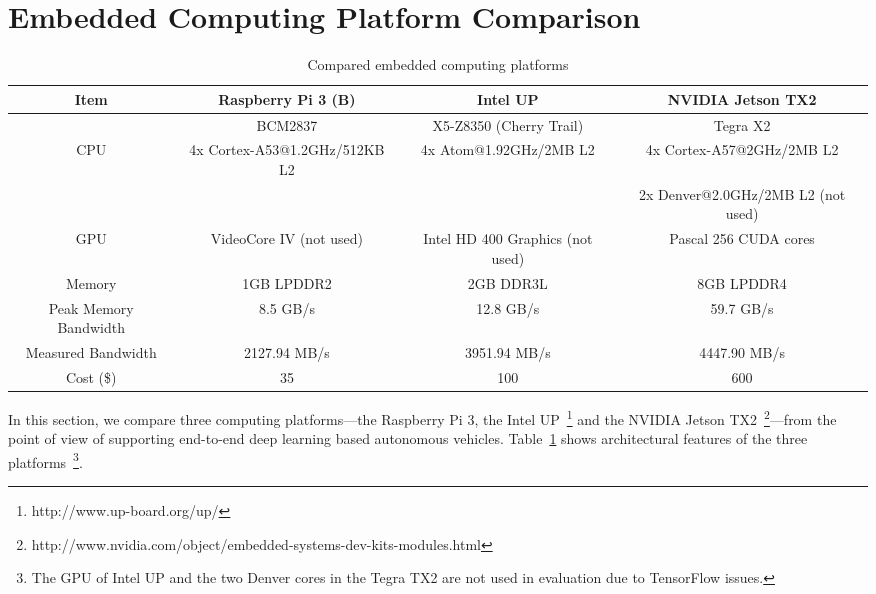 
%

\section{Embedded Computing Platform Comparison}\label{sec:comparison}


\begin{table}[h]
  \centering
  \begin{adjustbox}{width=1\textwidth}
  \begin{tabular}{|c|c|c|c|}
    \hline
    Item    & Raspberry Pi 3 (B)   & Intel UP                  & NVIDIA Jetson TX2\\
    \hline
            & BCM2837              & X5-Z8350 (Cherry Trail)   & Tegra X2 \\
    CPU     & 4x Cortex-A53@1.2GHz/512KB L2  &
              4x Atom@1.92GHz/2MB L2 &
              4x Cortex-A57@2GHz/2MB L2 \\
            &              &              & 2x Denver@2.0GHz/2MB L2 (not used)  \\
    \hline
    GPU     &  VideoCore IV (not used)    &
               Intel HD 400 Graphics (not used) &
               Pascal 256 CUDA cores   \\
    \hline
    Memory  & 1GB LPDDR2   &  2GB DDR3L     & 8GB LPDDR4              \\
    \hline
	Peak Memory Bandwidth & 8.5 GB/s & 12.8 GB/s & 59.7 GB/s \\
	\hline
	Measured Bandwidth & 2127.94 MB/s & 3951.94 MB/s & 4447.90 MB/s \\
	\hline
	Cost (\$) & 35 & 100 & 600 \\
	\hline
  \end{tabular}
  \end{adjustbox}
  \caption{Compared embedded computing platforms}
  \label{tbl:platforms}
\end{table}

In this section, we compare three computing platforms---the Raspberry
Pi 3, the Intel UP~\footnote{http://www.up-board.org/up/} and the NVIDIA
Jetson
TX2~\footnote{http://www.nvidia.com/object/embedded-systems-dev-kits-modules.html}---from
the point of view of supporting end-to-end deep learning
based autonomous vehicles. 
Table~\ref{tbl:platforms} shows architectural features of the three
platforms~\footnote{The GPU of Intel UP and the two Denver cores in the
  Tegra TX2 are not used in evaluation due to TensorFlow issues.}.
  
